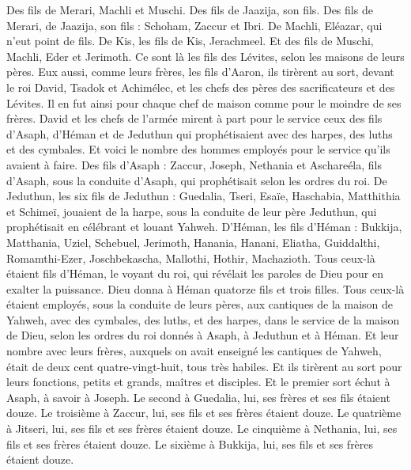 \begin{multicols}{2}
Des fils de Merari, Machli et Muschi. Des fils de Jaazija, son fils.
Des fils de Merari, de Jaazija, son fils : Schoham, Zaccur et Ibri.
De Machli, Eléazar, qui n'eut point de fils.
De Kis, les fils de Kis, Jerachmeel.
Et des fils de Muschi, Machli, Eder et Jerimoth. Ce sont là les fils des Lévites, selon les maisons de leurs pères.
Eux aussi, comme leurs frères, les fils d'Aaron, ils tirèrent au sort, devant le roi David, Tsadok et Achimélec, et les chefs des pères des sacrificateurs et des Lévites. Il en fut ainsi pour chaque chef de maison comme pour le moindre de ses frères.
\VerseOne{}David et les chefs de l'armée mirent à part pour le service ceux des fils d'Asaph, d'Héman et de Jeduthun qui prophétisaient avec des harpes, des luths et des cymbales. Et voici le nombre des hommes employés pour le service qu'ils avaient à faire.
Des fils d'Asaph : Zaccur, Joseph, Nethania et Aschareéla, fils d'Asaph, sous la conduite d'Asaph, qui prophétisait selon les ordres du roi.
De Jeduthun, les six fils de Jeduthun : Guedalia, Tseri, Esaïe, Haschabia, Matthithia et Schimeï, jouaient de la harpe, sous la conduite de leur père Jeduthun, qui prophétisait en célébrant et louant Yahweh.
D'Héman, les fils d'Héman : Bukkija, Matthania, Uziel, Schebuel, Jerimoth, Hanania, Hanani, Eliatha, Guiddalthi, Romamthi-Ezer, Joschbekascha, Mallothi, Hothir, Machazioth.
Tous ceux-là étaient fils d'Héman, le voyant du roi, qui révélait les paroles de Dieu pour en exalter la puissance. Dieu donna à Héman quatorze fils et trois filles.
Tous ceux-là étaient employés, sous la conduite de leurs pères, aux cantiques de la maison de Yahweh, avec des cymbales, des luths, et des harpes, dans le service de la maison de Dieu, selon les ordres du roi donnés à Asaph, à Jeduthun et à Héman.
Et leur nombre avec leurs frères, auxquels on avait enseigné les cantiques de Yahweh, était de deux cent quatre-vingt-huit, tous très habiles.
Et ils tirèrent au sort pour leurs fonctions, petits et grands, maîtres et disciples.
Et le premier sort échut à Asaph, à savoir à Joseph. Le second à Guedalia, lui, ses frères et ses fils étaient douze.
Le troisième à Zaccur, lui, ses fils et ses frères étaient douze.
Le quatrième à Jitseri, lui, ses fils et ses frères étaient douze.
Le cinquième à Nethania, lui, ses fils et ses frères étaient douze.
Le sixième à Bukkija, lui, ses fils et ses frères étaient douze.

\end{multicols}
